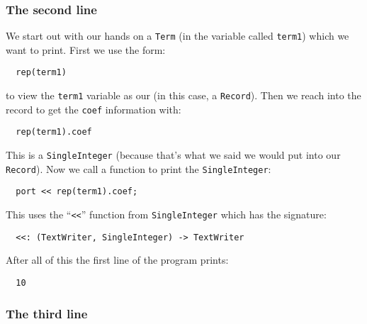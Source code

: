 \subsubsection{The second line}

We start out with our hands on a \verb"Term" (in the variable called 
\verb"term1") 
which we want to print. First we use the form:

\begin{small}
\begin{verbatim}
  rep(term1)
\end{verbatim}
\end{small}

to view the \verb"term1" variable as our  (in this case, a \verb"Record"). 
Then we reach into the record to get the \verb"coef" information with:

\begin{small}
\begin{verbatim}
  rep(term1).coef
\end{verbatim}
\end{small}

This is a \verb"SingleInteger" (because that's what we said we would put
into our \verb"Record"). Now we call a function to print the \verb"SingleInteger":

\begin{small}
\begin{verbatim}
  port << rep(term1).coef;
\end{verbatim}
\end{small}

This uses the ``\verb+<<+'' function from \verb"SingleInteger" which has the signature:

\begin{small}
\begin{verbatim}
  <<: (TextWriter, SingleInteger) -> TextWriter
\end{verbatim}
\end{small}

After all of this the first line of the program prints:

\begin{small}
\begin{verbatim}
  10
\end{verbatim}
\end{small}

\subsubsection{The third line}

